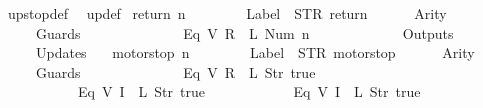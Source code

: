 \begin{isabellebody}
\ \ up{}{}stop{\isacharunderscore}def\isanewline
\ \ up{}{}{\isacharunderscore}def\isanewline
\isanewline
{}\isamarkupfalse%
\ {\isachardoublequoteopen}return\ n\ {\isasymequiv}\ {\isasymlparr}\isanewline
\ \ \ \ \ \ Label\ {\isacharequal}\ STR\ {\isacharprime}{\isacharprime}return{\isacharprime}{\isacharprime}{\isacharcomma}\isanewline
\ \ \ \ \ \ Arity\ {\isacharequal}\ {}{\isacharcomma}\isanewline
\ \ \ \ \ \ Guards\ {\isacharequal}\ {\isacharbrackleft}\isanewline
\ \ \ \ \ \ \ \ \ \ \ \ {\isacharparenleft}Eq\ {\isacharparenleft}V\ {\isacharparenleft}R\ {}{\isacharparenright}{\isacharparenright}\ {\isacharparenleft}L\ {\isacharparenleft}Num\ n{\isacharparenright}{\isacharparenright}{\isacharparenright}\isanewline
\ \ \ \ \ \ {\isacharbrackright}{\isacharcomma}\isanewline
\ \ \ \ \ \ Outputs\ {\isacharequal}\ {\isacharbrackleft}{\isacharbrackright}{\isacharcomma}\isanewline
\ \ \ \ \ \ Updates\ {\isacharequal}\ {\isacharbrackleft}{\isacharbrackright}\isanewline
{\isasymrparr}{\isachardoublequoteclose}\isanewline
\isanewline
{}\isamarkupfalse%
\ {\isachardoublequoteopen}motorstop\ n\ {\isasymequiv}\ {\isasymlparr}\isanewline
\ \ \ \ \ \ Label\ {\isacharequal}\ STR\ {\isacharprime}{\isacharprime}motorstop{\isacharprime}{\isacharprime}{\isacharcomma}\isanewline
\ \ \ \ \ \ Arity\ {\isacharequal}\ {}{\isacharcomma}\isanewline
\ \ \ \ \ \ Guards\ {\isacharequal}\ {\isacharbrackleft}\isanewline
\ \ \ \ \ \ \ \ \ \ \ \ {\isacharparenleft}Eq\ {\isacharparenleft}V\ {\isacharparenleft}R\ {}{\isacharparenright}{\isacharparenright}\ {\isacharparenleft}L\ {\isacharparenleft}Str\ {\isacharprime}{\isacharprime}true{\isacharprime}{\isacharprime}{\isacharparenright}{\isacharparenright}{\isacharparenright}{\isacharcomma}\isanewline
\ \ \ \ \ \ \ \ \ \ \ \ {\isacharparenleft}Eq\ {\isacharparenleft}V\ {\isacharparenleft}I\ {}{\isacharparenright}{\isacharparenright}\ {\isacharparenleft}L\ {\isacharparenleft}Str\ {\isacharprime}{\isacharprime}true{\isacharprime}{\isacharprime}{\isacharparenright}{\isacharparenright}{\isacharparenright}{\isacharcomma}\isanewline
\ \ \ \ \ \ \ \ \ \ \ \ {\isacharparenleft}Eq\ {\isacharparenleft}V\ {\isacharparenleft}I\ {}{\isacharparenright}{\isacharparenright}\ {\isacharparenleft}L\ {\isacharparenleft}Str\ {\isacharprime}{\isacharprime}true{\isacharprime}{\isacharprime}{\isacharparenright}{\isacharparenright}{\isacharparenright}\isanewline
\ \ \ \ \ \ {\isacharbrackright}{\isacharcomma}\isanewline

\end{isabellebody}
